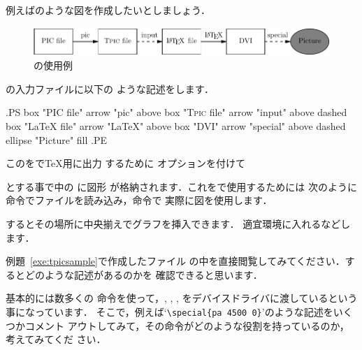 \begin{Exe}\label{exe:tpicsample}
例えばのような図を作成したいとしましょう．
\begin{figure}[htbp]
\begin{center}
 \includegraphics[width=\linewidth]{images/tpicsample.pdf}
 \caption{\Tpic の使用例}
\end{center}
\end{figure}
{\PIC}の入力ファイルに以下の
ような記述をします．

\begin{InText}
.PS
 box "PIC file" 
 arrow "pic" above 
 box "\textsc{Tpic} file"
 arrow "input" above dashed
 box "{\LaTeX} file"
 arrow "{\LaTeX}" above
 box "DVI"
 arrow "special" above dashed
 ellipse "Picture" fill
.PE
\end{InText}

このをで{\TeX}用に出力
するために  オプションを付けて
\begin{InTerm}
\end{InTerm}
とする事で中の に図形
が格納されます．これをで使用するためには
次のように 命令でファイルを読み込み，命令で
実際に図を使用します．

\begin{InTeX}
 
\begin{center}
  {\box\graph}
\end{center}
\end{InTeX}

するとその場所に中央揃えでグラフを挿入できます．
適宜環境に入れるなどします．
\end{Exe}

\begin{Prob}
例題~\ref{exe:tpicsample}で作成したファイル 
の中を直接閲覧してみてください．するとどのような記述があるのかを
確認できると思います．

基本的には数多くの  命令を使って，, ,
, をデバイスドライバに渡しているという事になっています．
そこで，例えば`\verb|\special{pa 4500 0}|'のような記述をいくつかコメント
アウトしてみて，その命令がどのような役割を持っているのか，考えてみてくだ
さい．
\end{Prob}

